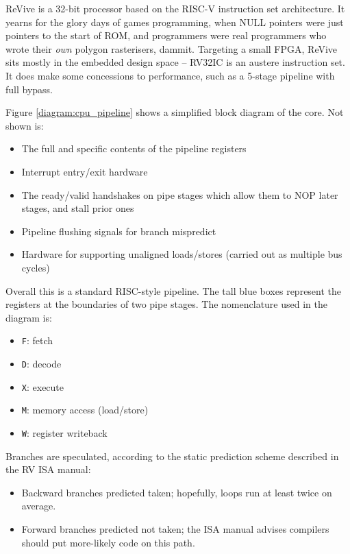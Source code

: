 \documentclass{article}
\begin{document}
ReVive is a 32-bit processor based on the RISC-V instruction set architecture. It yearns for the glory days of games programming, when NULL pointers were just pointers to the start of ROM, and programmers were real programmers who wrote their \textit{own} polygon rasterisers, dammit. Targeting a small FPGA, ReVive sits mostly in the embedded design space -- RV32IC is an austere instruction set. It does make some concessions to performance, such as a 5-stage pipeline with full bypass.

Figure \ref{diagram:cpu_pipeline} shows a simplified block diagram of the core. Not shown is:
\begin{itemize}
\item The full and specific contents of the pipeline registers
\item Interrupt entry/exit hardware
\item The ready/valid handshakes on pipe stages which allow them to NOP later stages, and stall prior ones
\item Pipeline flushing signals for branch mispredict
\item Hardware for supporting unaligned loads/stores (carried out as multiple bus cycles)
\end{itemize}

Overall this is a standard RISC-style pipeline. The tall blue boxes represent the registers at the boundaries of two pipe stages. The nomenclature used in the diagram is:

\begin{itemize}
\item \texttt{F}: fetch
\item \texttt{D}: decode
\item \texttt{X}: execute
\item \texttt{M}: memory access (load/store)
\item \texttt{W}: register writeback
\end{itemize}

Branches are speculated, according to the static prediction scheme described in the RV ISA manual:

\begin{itemize}
\item Backward branches predicted taken; hopefully, loops run at least twice on average.
\item Forward branches predicted not taken; the ISA manual advises compilers should put more-likely code on this path.
\end{itemize}
\end{document}
